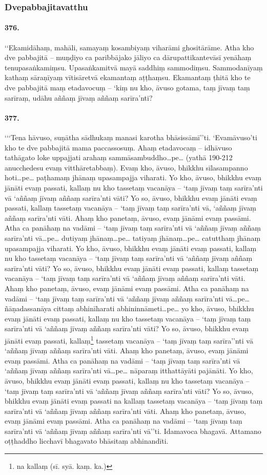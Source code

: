 \subsubsection{Dvepabbajitavatthu}

\paragraph{376.} ‘‘Ekamidāhaṃ, mahāli, samayaṃ kosambiyaṃ viharāmi ghositārāme. Atha kho dve pabbajitā – muṇḍiyo ca paribbājako jāliyo ca dārupattikantevāsī yenāhaṃ tenupasaṅkamiṃsu. Upasaṅkamitvā mayā saddhiṃ sammodiṃsu. Sammodanīyaṃ kathaṃ sāraṇīyaṃ vītisāretvā ekamantaṃ aṭṭhaṃsu. Ekamantaṃ ṭhitā kho te dve pabbajitā maṃ etadavocuṃ – ‘kiṃ nu kho, āvuso gotama, taṃ jīvaṃ taṃ sarīraṃ, udāhu aññaṃ jīvaṃ aññaṃ sarīra’nti?

\paragraph{377.} ‘‘‘Tena hāvuso, suṇātha sādhukaṃ manasi karotha bhāsissāmī’’ti. ‘Evamāvuso’ti kho te dve pabbajitā mama paccassosuṃ. Ahaṃ etadavocaṃ – idhāvuso tathāgato loke uppajjati arahaṃ sammāsambuddho…pe… (yathā 190-212 anucchedesu evaṃ vitthāretabbaṃ). Evaṃ kho, āvuso, bhikkhu sīlasampanno hoti…pe… paṭhamaṃ jhānaṃ upasampajja viharati. Yo kho, āvuso, bhikkhu evaṃ jānāti evaṃ passati, kallaṃ nu kho tassetaṃ vacanāya – ‘taṃ jīvaṃ taṃ sarīra’nti vā ‘aññaṃ jīvaṃ aññaṃ sarīra’nti vāti? Yo so, āvuso, bhikkhu evaṃ jānāti evaṃ passati, kallaṃ tassetaṃ vacanāya – ‘taṃ jīvaṃ taṃ sarīra’nti vā, ‘aññaṃ jīvaṃ aññaṃ sarīra’nti vāti. Ahaṃ kho panetaṃ, āvuso, evaṃ jānāmi evaṃ passāmi. Atha ca panāhaṃ na vadāmi – ‘taṃ jīvaṃ taṃ sarīra’nti vā ‘aññaṃ jīvaṃ aññaṃ sarīra’nti vā…pe… dutiyaṃ jhānaṃ…pe… tatiyaṃ jhānaṃ…pe… catutthaṃ jhānaṃ upasampajja viharati. Yo kho, āvuso, bhikkhu evaṃ jānāti evaṃ passati, kallaṃ nu kho tassetaṃ vacanāya – ‘taṃ jīvaṃ taṃ sarīra’nti vā ‘aññaṃ jīvaṃ aññaṃ sarīra’nti vāti? Yo so, āvuso, bhikkhu evaṃ jānāti evaṃ passati, kallaṃ tassetaṃ vacanāya – ‘taṃ jīvaṃ taṃ sarīra’nti vā ‘aññaṃ jīvaṃ aññaṃ sarīra’nti vāti. Ahaṃ kho panetaṃ, āvuso, evaṃ jānāmi evaṃ passāmi. Atha ca panāhaṃ na vadāmi – ‘taṃ jīvaṃ taṃ sarīra’nti vā ‘aññaṃ jīvaṃ aññaṃ sarīra’nti vā…pe… ñāṇadassanāya cittaṃ abhinīharati abhininnāmeti…pe… yo kho, āvuso, bhikkhu evaṃ jānāti evaṃ passati, kallaṃ nu kho tassetaṃ vacanāya – ‘taṃ jīvaṃ taṃ sarīra’nti vā ‘aññaṃ jīvaṃ aññaṃ sarīra’nti vāti? Yo so, āvuso, bhikkhu evaṃ jānāti evaṃ passati, kallaṃ\footnote{na kallaṃ (sī. syā. kaṃ. ka.)} tassetaṃ vacanāya – ‘taṃ jīvaṃ taṃ sarīra’’nti vā ‘aññaṃ jīvaṃ aññaṃ sarīra’nti vāti. Ahaṃ kho panetaṃ, āvuso, evaṃ jānāmi evaṃ passāmi. Atha ca panāhaṃ na vadāmi – ‘taṃ jīvaṃ taṃ sarīra’nti vā ‘aññaṃ jīvaṃ aññaṃ sarīra’nti vā…pe… nāparaṃ itthattāyāti pajānāti. Yo kho, āvuso, bhikkhu evaṃ jānāti evaṃ passati, kallaṃ nu kho tassetaṃ vacanāya – ‘taṃ jīvaṃ taṃ sarīra’nti vā ‘aññaṃ jīvaṃ aññaṃ sarīra’nti vāti? Yo so, āvuso, bhikkhu evaṃ jānāti evaṃ passati na kallaṃ tassetaṃ vacanāya – ‘taṃ jīvaṃ taṃ sarīra’nti vā ‘aññaṃ jīvaṃ aññaṃ sarīra’nti vāti. Ahaṃ kho panetaṃ, āvuso, evaṃ jānāmi evaṃ passāmi. Atha ca panāhaṃ na vadāmi – ‘taṃ jīvaṃ taṃ sarīra’nti vā ‘aññaṃ jīvaṃ aññaṃ sarīra’nti vā’’ti. Idamavoca bhagavā. Attamano oṭṭhaddho licchavī bhagavato bhāsitaṃ abhinandīti.

